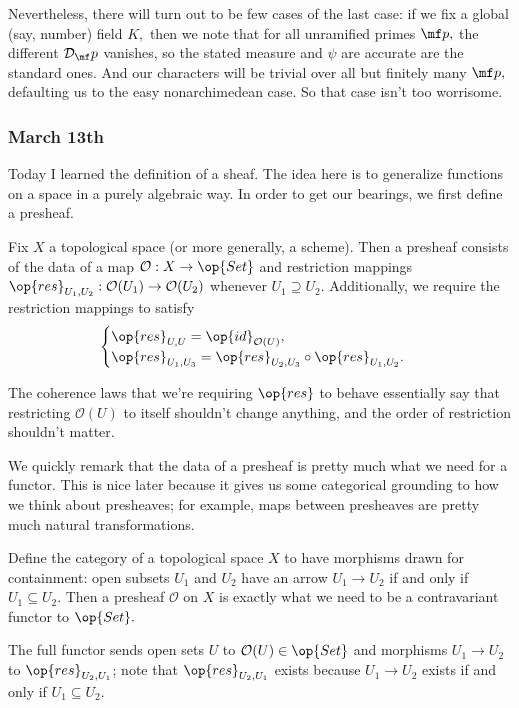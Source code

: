 Nevertheless, there will turn out to be few cases of the last case: if we fix a global (say, number) field $K,$ then we note that for all unramified primes $\mf p,$ the different $\mathcal D_\mf p$ vanishes, so the stated measure and $\psi$ are accurate are the standard ones. And our characters will be trivial over all but finitely many $\mf p,$ defaulting us to the easy nonarchimedean case. So that case isn't too worrisome.

\subsubsection{March 13th}
Today I learned the definition of a sheaf. The idea here is to generalize functions on a space in a purely algebraic way. In order to get our bearings, we first define a presheaf.
\begin{definition}
    Fix $X$ a topological space (or more generally, a scheme). Then a presheaf consists of the data of a map $\mathcal O:X\to\op{Set}$ and restriction mappings $\op{res}_{U_1,U_2}:\mathcal O(U_1)\to\mathcal O(U_2)$ whenever $U_1\supseteq U_2.$ Additionally, we require the restriction mappings to satisfy
    \[\begin{cases}
        \op{res}_{U,U}=\op{id}_{\mathcal O(U)}, \\
        \op{res}_{U_1,U_3}=\op{res}_{U_2,U_3}\circ\op{res}_{U_1,U_2}.
    \end{cases}\]
\end{definition}
The coherence laws that we're requiring $\op{res}$ to behave essentially say that restricting $\mathcal O(U)$ to itself shouldn't change anything, and the order of restriction shouldn't matter.

We quickly remark that the data of a presheaf is pretty much what we need for a functor. This is nice later because it gives us some categorical grounding to how we think about presheaves; for example, maps between presheaves are pretty much natural transformations.
\begin{proposition}
    Define the category of a topological space $X$ to have morphisms drawn for containment: open subsets $U_1$ and $U_2$ have an arrow $U_1\to U_2$ if and only if $U_1\subseteq U_2.$ Then a presheaf $\mathcal O$ on $X$ is exactly what we need to be a contravariant functor to $\op{Set}.$
\end{proposition}
The full functor sends open sets $U$ to $\mathcal O(U)\in\op{Set}$ and morphisms $U_1\to U_2$ to $\op{res}_{U_2,U_1}$; note that $\op{res}_{U_2,U_1}$ exists because $U_1\to U_2$ exists if and only if $U_1\subseteq U_2.$

